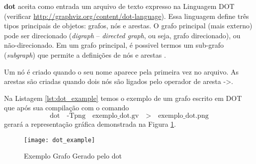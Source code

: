 \textbf{dot} aceita como entrada um arquivo de texto expresso na Linguagem
DOT (verificar \url{http://graphviz.org/content/dot-language}). Essa
linguagem define três tipos principais de objetos: grafos, nós e arestas.
O grafo principal (mais externo) pode ser direcionado (\emph{digraph} {--}
\emph{directed graph}, ou seja, grafo direcionado), ou não-direcionado. Em um
grafo principal, é possivel termos um sub-grafo (\emph{subgraph}) que permite
a definições de nós e arestas \cite{gansner09}.

Um nó é criado quando o seu nome aparece pela primeira vez no arquivo. As
arestas são criadas quando dois nós são ligados pelo operador de aresta {->}.

Na Listagem \ref{lst:dot_example} temos o exemplo de um grafo escrito em
DOT que após sua compilação com o comando
$$
\text{dot} \quad \text{-Tpng} \quad \text{exemplo\_dot.gv} \quad \text{>}
\quad \text{exemplo\_dot.png}
$$
gerará a representação gráfica demonstrada na Figura \ref{fig:dot_example}.



\begin{figure}
	\begin{center}
		\texttt{[image: dot\_example]}
	\end{center}
	\caption{Exemplo Grafo Gerado pelo dot}
	\label{fig:dot_example}
\end{figure}
